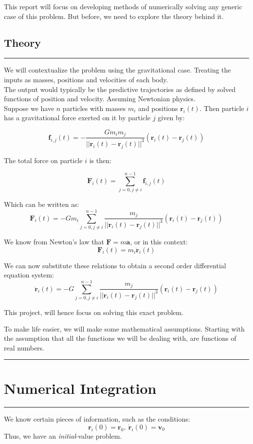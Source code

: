 \documentclass[hidelinks, 11pt, dvipsnames]{article}
\newcommand{\psection}[1]{{
    \begin{center}
        \noindent \rule{17cm}{0.4pt}
            \section*{\LARGE #1}
        \noindent \rule{17cm}{0.4pt}
    \end{center}
}}
\newcommand{\psubsection}[1]{{
    \begin{center}
            \section*{\Large #1}
        \noindent \rule{17cm}{0.2pt}
    \end{center}
}}
\begin{document}
This report will focus on developing methods of numerically solving any generic case of this problem. But before, we need to explore the theory behind it.

\newpage
\psubsection{Theory}
We will contextualize the problem using the gravitational case. Treating the inputs as masses, positions and velocities of each body. \\

The output would typically be the predictive trajectories as defined by solved functions of position and velocity. Assuming Newtonian physics. \\

Suppose we have $n$ particles with masses $m_i$ and positions $\mathbf{r}_i(t)$. Then particle $i$ has a gravitational force exerted on it by particle $j$ given by:

$$ \mathbf{f}_{i,j}(t) = -\frac{Gm_i m_j}{|| \mathbf{r}_i(t) - \mathbf{r}_j(t) ||^3}(\mathbf{r}_i(t) - \mathbf{r}_j(t)) $$

The total force on particle $i$ is then:

$$ \mathbf{F}_i(t) = \sum_{j=0, j\ne i}^{n-1} \mathbf{f}_{i,j}(t) $$

Which can be written as:
$$ \mathbf{F}_i(t) = -Gm_i \sum_{j=0, j\ne i}^{n-1} \frac{ m_j}{|| \mathbf{r}_i(t) - \mathbf{r}_j(t) ||^3}(\mathbf{r}_i(t) - \mathbf{r}_j(t)) $$

We know from Newton's law that $\mathbf{F} = m\mathbf{a}$, or in this context:
$$ \mathbf{F}_i(t) = m_i\mathbf{\ddot{r}}_i(t) $$

We can now substitute these relations to obtain a second order differential equation system:
$$ \mathbf{\ddot{r}}_i(t) = -G \sum_{j=0, j\ne i}^{n-1} \frac{ m_j}{|| \mathbf{r}_i(t) - \mathbf{r}_j(t) ||^3}(\mathbf{r}_i(t) - \mathbf{r}_j(t)) $$

This project, will hence focus on solving this exact problem.

To make life easier, we will make some mathematical assumptions. Starting with the assumption that all the functions we will be dealing with, are functions of real numbers.

\newpage

\psection{Numerical Integration}

We know certain pieces of information, such as the conditions:
$$ \mathbf{r}_i(0) = \mathbf{r}_0,\ \mathbf{\dot{r}}_i(0) = \mathbf{v}_0 $$
Thus, we have an \emph{initial}-value problem. \\
\end{document}
